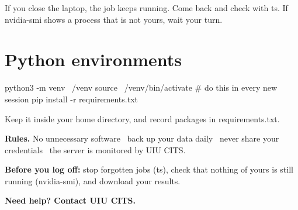 \documentclass[12pt,a4paper]{article}
\newcommand{\cmd}[1]{{\ttfamily\small #1}}
\begin{document}
If you close the laptop, the job keeps running. Come back and check with \cmd{ts}. If \cmd{nvidia-smi}
shows a process that is not yours, wait your turn.

\section{Python environments}

\begin{srvblock}
python3 -m venv ~/venv
source ~/venv/bin/activate        # do this in every new session
pip install -r requirements.txt
\end{srvblock}

Keep it inside your home directory, and record packages in \cmd{requirements.txt}.

\begin{tipbox}
\textbf{Rules.} No unnecessary software \textperiodcentered\ back up your data daily \textperiodcentered\
never share your credentials \textperiodcentered\ the server is monitored by UIU CITS.
\end{tipbox}

\begin{tipbox}
\textbf{Before you log off:} stop forgotten jobs (\cmd{ts}), check that nothing of yours is
still running (\cmd{nvidia-smi}), and download your results.
\end{tipbox}

\begin{center}
\small\color{rose}\textbf{Need help? Contact UIU CITS.}
\end{center}
\end{document}
